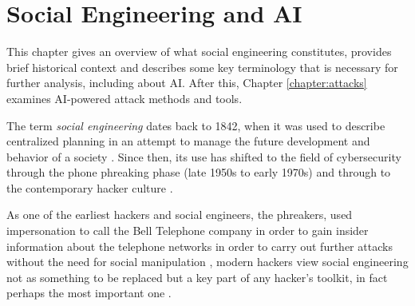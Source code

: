 

    

\chapter{Social Engineering and AI\label{chapter:definition}}
\begin{comment}

Guides:
    - Page limit 1-2 pages
    - Context and terminology (käsitteet), challenges and measurement criteria, values, research question analysis
    - Second to last paragraph contains the research question (RQ) and the results

TODO:
    [ ] 

What to cover:
    - What is cybersecurity and why it's of paramount importance
    - What is social engineering
        - Brief history of social engineering
            - Phishing in 1996 via AOL
    - Attacks, classical social engineering attacks
        - Phishing, vishing, smishing
        - Tailgating
        - Baiting (not always considered SE)
        - Dumpster diving (not always considered SE)
    - Countermeasures, classical
        - User awareness & training programs
        - Company policy & company culture
        - Real-time threat detection
        - Vulnerability detection
    - Typical challenges
    - Motives for cybercrimes
        - Hard(er) to detect?
        - "Easy" wins?

Literature:
    - Defining Social Engineering in Cybersecurity

\end{comment}

This chapter gives an overview of what social engineering constitutes, provides brief historical context and describes some key terminology that is necessary for further analysis, including about AI. After this, Chapter \ref{chapter:attacks}  examines AI-powered attack methods and tools.

The term \textit{social engineering} dates back to 1842, when it was used to describe centralized planning in an attempt to manage the future development and behavior of a society \citep{hatfieldSocialEngineeringCybersecurity2018a}. Since then, its use has shifted to the field of cybersecurity through the phone phreaking phase (late 1950s to early 1970s) and through to the contemporary hacker culture \citep{wangDefiningSocialEngineering2020}.

As one of the earliest hackers and social engineers, the phreakers, used impersonation to call the Bell Telephone company in order to gain insider information about the telephone networks in order to carry out further attacks without the need for social manipulation \citep{hatfieldSocialEngineeringCybersecurity2018a}, modern hackers view social engineering not as something to be replaced but a key part of any hacker's toolkit, in fact perhaps the most important one \citep{mitnickArtDeceptionControlling2003}.

